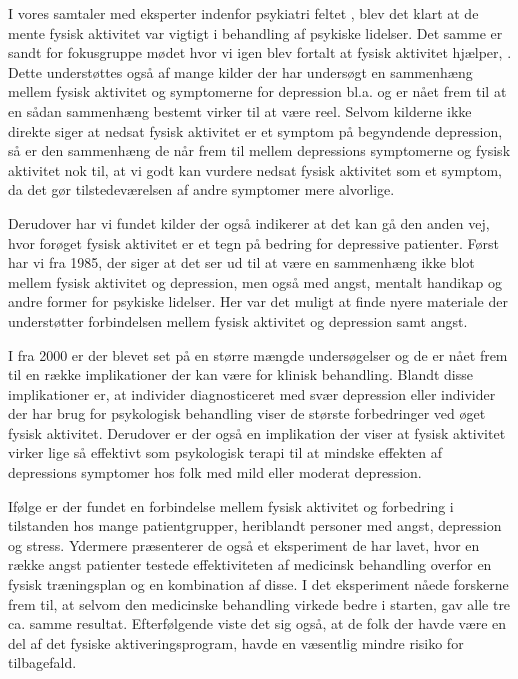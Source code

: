 I vores samtaler med eksperter indenfor psykiatri feltet \citep[Kapitel 1, Sektion 3 og 4]{misc:faellesrapp}, blev det klart at de mente fysisk aktivitet var vigtigt i behandling af psykiske lidelser.
Det samme er sandt for fokusgruppe mødet hvor vi igen blev fortalt at fysisk aktivitet hjælper, \citep[Kapitel 1, Sektion 5]{misc:faellesrapp}.
Dette understøttes også af mange kilder der har undersøgt en sammenhæng mellem fysisk aktivitet og symptomerne for depression bl.a. \citep{art:physDepSymptoms, Strawbridge15082002, Arredondo01072012} og er nået frem til at en sådan sammenhæng bestemt virker til at være reel.
Selvom kilderne ikke direkte siger at nedsat fysisk aktivitet er et symptom på begyndende depression, så er den sammenhæng de når frem til mellem depressions symptomerne og fysisk aktivitet nok til, at vi godt kan vurdere nedsat fysisk aktivitet som et symptom, da det gør tilstedeværelsen af andre symptomer mere alvorlige.

Derudover har vi fundet kilder der også indikerer at det kan gå den anden vej, hvor forøget fysisk aktivitet er et tegn på bedring for depressive patienter.
Først har vi \citet{misc:healthReports} fra 1985, der siger at det ser ud til at være en sammenhæng ikke blot mellem fysisk aktivitet og depression, men også med angst, mentalt handikap og andre former for psykiske lidelser.
Her var det muligt at finde nyere materiale der understøtter forbindelsen mellem fysisk aktivitet og depression samt angst.

I \citet{art:physMental} fra 2000 er der blevet set på en større mængde undersøgelser og de er nået frem til en række implikationer der kan være for klinisk behandling.
Blandt disse implikationer er, at individer diagnosticeret med svær depression eller individer der har brug for psykologisk behandling viser de største forbedringer ved øget fysisk aktivitet.
Derudover er der også en implikation der viser at fysisk aktivitet virker lige så effektivt som psykologisk terapi til at mindske effekten af depressions symptomer hos folk med mild eller moderat depression.

Ifølge \citet{book:sportPsyc} er der fundet en forbindelse mellem fysisk aktivitet og forbedring i tilstanden hos mange patientgrupper, heriblandt personer med angst, depression og stress.
Ydermere præsenterer de også et eksperiment de har lavet, hvor en række angst patienter testede effektiviteten af medicinsk behandling overfor en fysisk træningsplan og en kombination af disse.
I det eksperiment nåede forskerne frem til, at selvom den medicinske behandling virkede bedre i starten, gav alle tre ca. samme resultat.
Efterfølgende viste det sig også, at de folk der havde være en del af det fysiske aktiveringsprogram, havde en væsentlig mindre risiko for tilbagefald.

